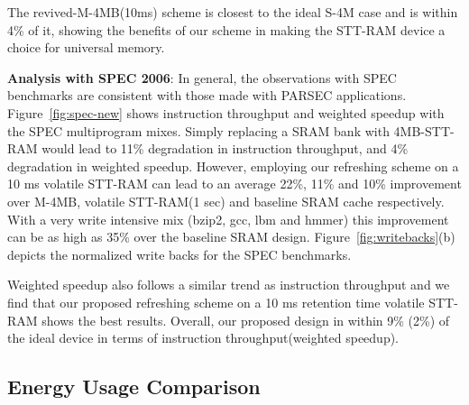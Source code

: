 The revived-M-4MB(10ms) scheme is closest to the ideal S-4M case and is within 4\% of it, showing the benefits of our scheme in making the STT-RAM device a choice for universal memory.

\begin{figure*} [t]
\centering
 \caption{\label{fig:spec-new} \scriptsize \bf Normalized Average Instruction Throughput(IT) and Weighted Speedup(WS) for SPEC 2006 multiprogrammed mixes. }
\end{figure*}

{\bf Analysis with SPEC 2006}: In general, the observations with SPEC benchmarks are consistent with those made with PARSEC applications. Figure~\ref{fig:spec-new} shows instruction throughput and weighted speedup with the  SPEC multiprogram
mixes. Simply replacing a SRAM bank with 4MB-STT-RAM would lead to 11\% degradation in instruction throughput, and 4\% degradation in weighted speedup. However, employing our refreshing scheme on a 10 ms volatile STT-RAM can lead to an average 22\%, 11\%  and 10\% improvement over M-4MB, volatile STT-RAM(1 sec) and baseline SRAM cache respectively. With a very write intensive mix (bzip2, gcc, lbm and hmmer) this improvement can be as high as 35\% over the baseline SRAM design. Figure~\ref{fig:writebacks}(b) depicts the normalized write backs for
the SPEC benchmarks.


Weighted speedup also follows a similar trend as instruction throughput and we find that our proposed refreshing scheme on a 10 ms retention time volatile STT-RAM shows the best results. Overall, our proposed design in within 9\% (2\%) of the ideal device in terms of instruction throughput(weighted speedup).

\subsection{Energy Usage Comparison}

